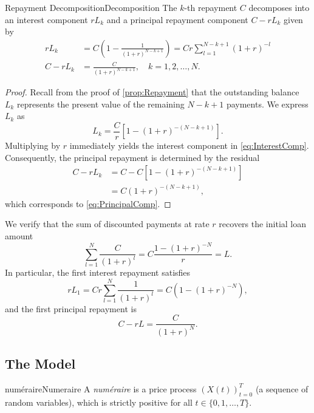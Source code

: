 \begin{prop}{Repayment Decomposition}{Decomposition}
	The \(k\)-th repayment \(C\) decomposes into an interest component \(rL_k\) and a principal repayment component \(C - rL_k\) given by
	\begin{align}
		rL_k     & = C \left( 1 - \frac{1}{(1+r)^{N-k+1}} \right) = C r \sum_{l=1}^{N-k+1} (1+r)^{-l} \label{eq:InterestComp} \\
		C - rL_k & = \frac{C}{(1+r)^{N-k+1}}, \quad k=1, 2, \dots, N. \label{eq:PrincipalComp}
	\end{align}
\end{prop}

\begin{proof}
	Recall from the proof of \ref{prop:Repayment} that the outstanding balance \(L_k\) represents the present value of the remaining \(N-k+1\) payments. We express \(L_k\) as
	\begin{equation}
		L_k = \frac{C}{r} \left[ 1 - (1+r)^{-(N-k+1)} \right].
	\end{equation}
	Multiplying by \(r\) immediately yields the interest component in \cref{eq:InterestComp}. Consequently, the principal repayment is determined by the residual
	\begin{align}
		C - rL_k & = C - C \left[ 1 - (1+r)^{-(N-k+1)} \right] \nonumber \\
		         & = C (1+r)^{-(N-k+1)},
	\end{align}
	which corresponds to \cref{eq:PrincipalComp}.
\end{proof}

\noindent We verify that the sum of discounted payments at rate \(r\) recovers the initial loan amount
\begin{equation}
	\sum_{l=1}^{N} \frac{C}{(1+r)^l} = C \frac{1 - (1+r)^{-N}}{r} = L.
\end{equation}
In particular, the first interest repayment satisfies
\begin{equation}
	rL_1 = C r \sum_{l=1}^{N} \frac{1}{(1+r)^l} = C \left( 1 - (1+r)^{-N} \right),
\end{equation}
and the first principal repayment is
\begin{equation}
	C - rL = \frac{C}{(1+r)^N}.
\end{equation}

\subsection{The Model}
\begin{defn}{num\'{e}raire}{Numeraire}
	A \emph{num\'{e}raire} is a price process \((X(t))_{t=0}^T\) (a sequence of random variables), which is strictly positive for all \(t \in \{0, 1, \dots, T\}\).
\end{defn}

